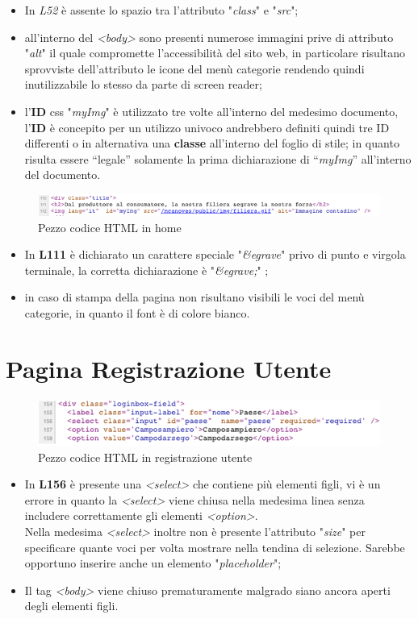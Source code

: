 \begin{itemize}
	\item In \textit{L52} è assente lo spazio tra l’attributo "\textit{class}" e "\textit{src}";
	\item all’interno del \textit{<body>} sono presenti numerose immagini prive di attributo "\textit{alt}" il quale compromette l’accessibilità del sito web, in particolare risultano sprovviste dell’attributo le icone del menù categorie rendendo quindi inutilizzabile lo stesso da parte di screen reader;
	\item l’\textbf{ID} css "\textit{myImg}" è utilizzato tre volte all’interno del medesimo documento, l’\textbf{ID} è concepito per un utilizzo univoco andrebbero definiti quindi tre ID differenti o in alternativa una \textbf{classe} all’interno del foglio di stile; in quanto risulta essere “legale” solamente la prima dichiarazione di “\textit{myImg}” all’interno del documento.
\end{itemize}
\begin{figure}[H]
	\includegraphics[width=\linewidth]{res/img/home3}
	\caption{Pezzo codice HTML in home}
	\label{Pezzo codice HTML in home}
\end{figure}
\begin{itemize}
	\item In \textbf{L111} è dichiarato un carattere speciale 	"\textit{\&egrave}" privo di punto e virgola terminale, la corretta dichiarazione è "\textit{\&egrave;}" ;
	\item in caso di stampa della pagina non risultano visibili le voci del menù categorie, in quanto il font è di colore bianco. 
\end{itemize}
\section{Pagina Registrazione Utente}
\begin{figure}[H]
	\includegraphics[width=\linewidth]{res/img/regut}
	\caption{Pezzo codice HTML in registrazione utente}
	\label{Pezzo codice HTML in registrazione utente}
\end{figure}
\begin{itemize}
	\item In \textbf{L156} è presente una \textit{<select>} che contiene più elementi figli, vi è un errore in quanto la \textit{<select>}  viene chiusa nella medesima linea senza includere correttamente gli elementi \textit{<option>}. \\ 
	Nella medesima \textit{<select>} inoltre non è presente l’attributo "\textit{size}" per specificare quante voci per volta mostrare nella tendina di selezione. Sarebbe opportuno inserire anche un elemento "\textit{placeholder}";
	\item Il tag \textit{<body>} viene chiuso prematuramente malgrado siano ancora aperti degli elementi figli.
\end{itemize}
